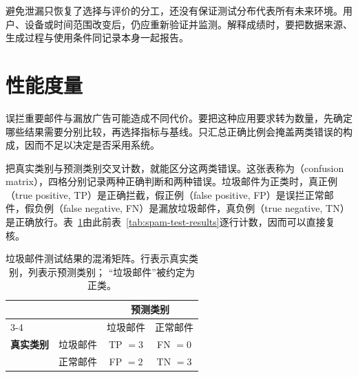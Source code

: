 避免泄漏只恢复了选择与评价的分工，还没有保证测试分布代表所有未来环境。用户、设备或时间范围改变后，仍应重新验证并监测。解释成绩时，要把数据来源、生成过程与使用条件同记录本身一起报告。

\section{性能度量}
\label{sec:performance-measures}

误拦重要邮件与漏放广告可能造成不同代价。要把这种应用要求转为数量，先确定哪些结果需要分别比较，再选择指标与基线。只汇总正确比例会掩盖两类错误的构成，因而不足以决定是否采用系统。

把真实类别与预测类别交叉计数，就能区分这两类错误。这张表称为（confusion matrix），四格分别记录两种正确判断和两种错误。垃圾邮件为正类时，真正例（true positive, TP）是正确拦截，假正例（false positive, FP）是误拦正常邮件，假负例（false negative, FN）是漏放垃圾邮件，真负例（true negative, TN）是正确放行。表~\ref{tab:spam-confusion-matrix}由此前表~\ref{tab:spam-test-results}逐行计数，因而可以直接复核。

\begin{table}[htbp]
  \centering
  \small
  \begin{tabular}{@{}llcc@{}}
    \toprule
    & & \multicolumn{2}{c}{\textbf{预测类别}} \\
    \cmidrule(l){3-4}
    & & 垃圾邮件 & 正常邮件 \\
    \midrule
    \textbf{真实类别} & 垃圾邮件 & TP $=3$ & FN $=0$ \\
                    & 正常邮件 & FP $=2$ & TN $=3$ \\
    \bottomrule
  \end{tabular}
  \caption{垃圾邮件测试结果的混淆矩阵。行表示真实类别，列表示预测类别；
  “垃圾邮件”被约定为正类。}
  \label{tab:spam-confusion-matrix}
\end{table}

